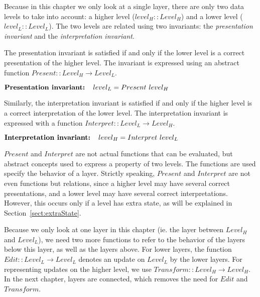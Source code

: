 
Because in this chapter we only look at a single layer, there are only two data levels to take into account: a higher level ($level_{H} :: Level_{H}$) and a lower level ($level_{L} :: Level_{L}$). The two levels are related using two invariants: the {\em presentation invariant} and the {\em interpretation invariant}. 

The presentation invariant is satisfied if and only if the lower level is a correct presentation of the higher level. The invariant is expressed using an abstract function 
$Present ::  Level_{H} \rightarrow Level_{L}$.

\begin{small}\begin{math}
\text{\bf Presentation invariant:~~~} level_{L} = Present~level_{H}\\
\end{math}\end{small}

Similarly, the interpretation invariant is satisfied if and only if the higher level is a correct interpretation of the lower level. The interpretation invariant is expressed with a function 
$Interpret ::  Level_{L} \rightarrow Level_{H}$.

\begin{small}\begin{math}
\text{\bf Interpretation invariant:~~~} level_{H} = Interpret~level_{L}\\
\end{math}\end{small}

$Present$ and $Interpret$ are not actual functions that can be evaluated, but abstract concepts used to express a property of two levels. The functions are used specify the behavior of a layer.
Strictly speaking, $Present$ and $Interpret$ are not even functions but relations, since a higher level may have several correct presentations, and a lower level may have several correct interpretations. However, this occurs only if a level has extra state, as will be explained in Section~\ref{sect:extraState}.

Because we only look at one layer in this chapter (ie. the layer between $Level_{H}$ and $Level_{L}$), we need two more functions to refer to the behavior of the layers below this layer, as well as the layers above. For lower layers, the function $Edit :: Level_{L} \rightarrow Level_{L}$ denotes an update on $Level_{L}$ by the lower layers. For representing updates on the higher level, we use 
$Transform :: Level_{H} \rightarrow Level_{H}$. In the next chapter, layers are connected, which removes the need for $Edit$ and $Transform$.

